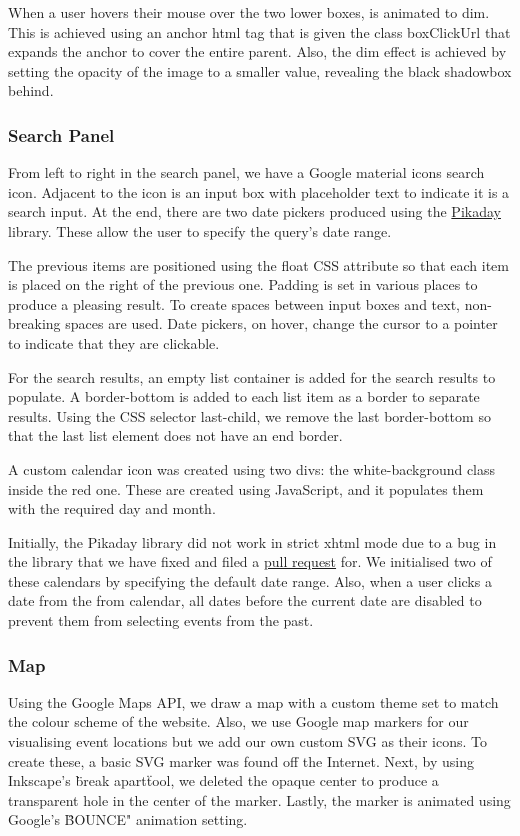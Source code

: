 \documentclass[10pt]{article}
\begin{document}
                When a user hovers their mouse over the two lower boxes, is animated to dim. This is achieved using an anchor html tag that is given the class boxClickUrl that expands the anchor to cover the entire parent. Also, the dim effect is achieved by setting the opacity of the image to a smaller value, revealing the black shadowbox behind.

            \subsubsection{Search Panel}
                From left to right in the search panel, we have a Google material icons search icon. Adjacent to the icon is an input box with placeholder text to indicate it is a search input. At the end, there are two date pickers produced using the \href{https://github.com/dbushell/Pikaday}{Pikaday} library. These allow the user to specify the query's date range.

                The previous items are positioned using the float CSS attribute so that each item is placed on the right of the previous one. Padding is set in various places to produce a pleasing result.  To create spaces between input boxes and text, non-breaking spaces are used. Date pickers, on hover, change the cursor to a pointer to indicate that they are clickable.

                For the search results, an empty list container is added for the search results to populate. A border-bottom is added to each list item as a border to separate results. Using the CSS selector last-child, we remove the last border-bottom so that the last list element does not have an end border.

                A custom calendar icon was created using two divs: the white-background class inside the red one. These are created using JavaScript, and it populates them with the required day and month.

                Initially, the Pikaday library did not work in strict xhtml mode due to a bug in the library that we have fixed and filed a \href{https://github.com/dbushell/Pikaday/pull/526}{pull request} for. We initialised two of these calendars by specifying the default date range. Also, when a user clicks a date from the from calendar, all dates before the current date are disabled to prevent them from selecting events from the past.

            \subsubsection{Map}
                Using the Google Maps API, we draw a map with a custom theme set to match the colour scheme of the  website. Also, we use Google map markers for our visualising event locations but we add our own custom SVG as their icons. To create these, a basic SVG marker was found off the Internet. Next, by using Inkscape's \"break apart\" tool, we deleted the opaque center to produce a transparent hole in the center of the marker. Lastly, the  marker is animated using Google's \"BOUNCE" animation setting.
\end{document}
